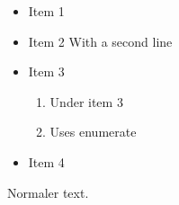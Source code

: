 \begin{frame}[t]
\begin{itemize}
\item Item 1
\item Item 2
With a second line
\item Item 3
\begin{enumerate}
\item Under item 3
\item Uses enumerate
\end{enumerate}
\item Item 4
\end{itemize}
Normaler text.
\end{frame}

